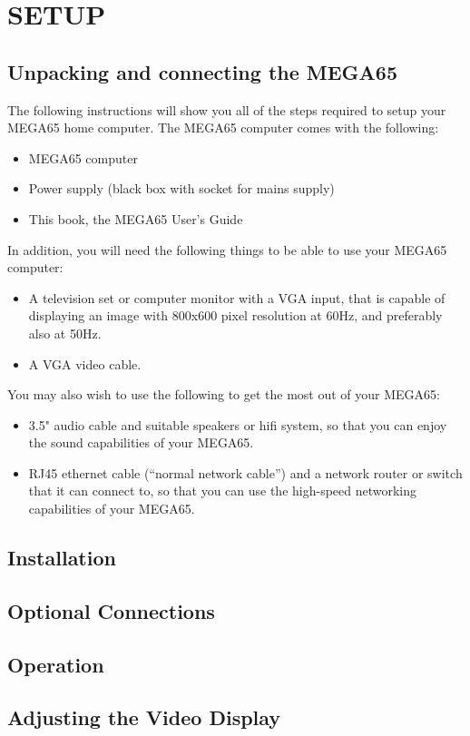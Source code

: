 \chapter{SETUP}
\section{Unpacking and connecting the MEGA65}

The following instructions will show you all of the steps required to setup your MEGA65 home computer.
The MEGA65 computer comes with the following:
\begin{itemize}
\item MEGA65 computer
\item Power supply (black box with socket for mains supply)
\item This book, the MEGA65 User's Guide
\end{itemize}

In addition, you will need the following things to be able to use your MEGA65 computer:
\begin{itemize}
\item A television set or computer monitor with a VGA input, that is capable of displaying an image with 800x600 pixel resolution at 60Hz, and preferably also at 50Hz.
\item A VGA video cable.
\end{itemize}

You may also wish to use the following to get the most out of your MEGA65:
\begin{itemize}
\item 3.5" audio cable and suitable speakers or hifi system, so that you can enjoy the sound capabilities of your MEGA65.
\item RJ45 ethernet cable (``normal network cable'') and a network router or switch that it can connect to, so that you can use the high-speed networking capabilities of your MEGA65.
\end{itemize}

\section{Installation}

\section{Optional Connections}

\section{Operation}

\section{Adjusting the Video Display}
